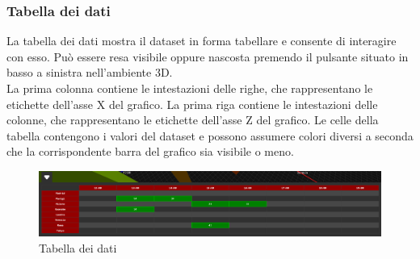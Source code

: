 \subsubsection{Tabella dei dati}
La tabella dei dati mostra il dataset in forma tabellare e consente di
interagire con esso. Può essere resa visibile oppure nascosta premendo il
pulsante situato in basso a sinistra nell'ambiente 3D.\\ La prima colonna
contiene le intestazioni delle righe, che rappresentano le etichette dell'asse
X del grafico. La prima riga contiene le intestazioni delle colonne, che
rappresentano le etichette dell'asse Z del grafico. Le celle della tabella
contengono i valori del dataset e possono assumere colori diversi a seconda che
la corrispondente barra del grafico sia visibile o meno.
\begin{figure}[ht!]
    \centering
    \includegraphics[scale=0.29]{template/images/table.png}
    \caption{Tabella dei dati}
\end{figure}